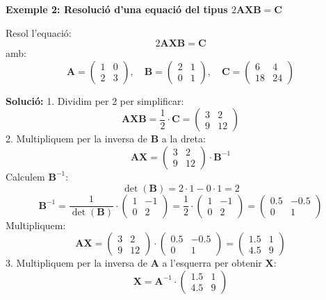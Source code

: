 \documentclass[12pt]{article}
\newcommand{\mat}[1]{\mathbf{#1}}
\begin{document}
\begin{exemple}
\textbf{Exemple 2: Resolució d'una equació del tipus \( 2\mat{A}\mat{X}\mat{B} = \mat{C} \)}

Resol l’equació:
\[
2\mat{A}\mat{X}\mat{B} = \mat{C}
\]
amb:
\[
\mat{A} = \begin{pmatrix}
1 & 0 \\
2 & 3
\end{pmatrix}, \quad
\mat{B} = \begin{pmatrix}
2 & 1 \\
0 & 1
\end{pmatrix}, \quad
\mat{C} = \begin{pmatrix}
6 & 4 \\
18 & 24
\end{pmatrix}
\]

\textbf{Solució:}
1. Dividim per 2 per simplificar:
\[
\mat{A} \mat{X} \mat{B} = \frac{1}{2} \cdot \mat{C} = \begin{pmatrix}
3 & 2 \\
9 & 12
\end{pmatrix}
\]
2. Multipliquem per la inversa de $\mat{B}$ a la dreta:
\[
\mat{A} \mat{X} = \begin{pmatrix}
3 & 2 \\
9 & 12
\end{pmatrix} \cdot \mat{B}^{-1}
\]
Calculem $\mat{B}^{-1}$:
\[
\det(\mat{B}) = 2 \cdot 1 - 0 \cdot 1 = 2
\]
\[
\mat{B}^{-1} = \frac{1}{\det(\mat{B})} \cdot \begin{pmatrix}
1 & -1 \\
0 & 2
\end{pmatrix}
= \frac{1}{2} \cdot \begin{pmatrix}
1 & -1 \\
0 & 2
\end{pmatrix}
= \begin{pmatrix}
0.5 & -0.5 \\
0 & 1
\end{pmatrix}
\]
Multipliquem:
\[
\mat{A} \mat{X} = \begin{pmatrix}
3 & 2 \\
9 & 12
\end{pmatrix} \cdot \begin{pmatrix}
0.5 & -0.5 \\
0 & 1
\end{pmatrix}
=
\begin{pmatrix}
1.5 & 1 \\
4.5 & 9
\end{pmatrix}
\]
3. Multipliquem per la inversa de $\mat{A}$ a l'esquerra per obtenir $\mat{X}$:
\[
\mat{X} = \mat{A}^{-1} \cdot \begin{pmatrix}
1.5 & 1 \\
4.5 & 9
\end{pmatrix}
\]
\end{exemple}
\end{document}
